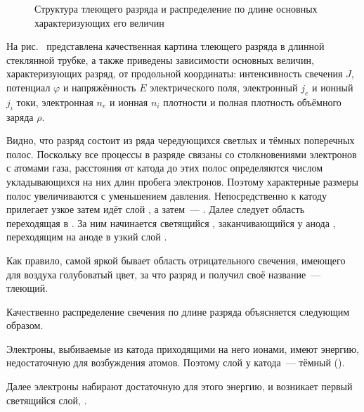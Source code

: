 


\begin{figure}[h!]
	\centering
	\caption{Структура тлеющего разряда и распределение по длине основных характеризующих его величин}
\end{figure}

На рис.~ представлена качественная картина тлеющего
разряда в длинной стеклянной трубке, а также приведены зависимости
основных величин, характеризующих разряд, от продольной координаты:
интенсивность свечения $J$, потенциал $\varphi$ и напряжённость $E$ электрического поля,
электронный $j_e$ и ионный $j_i$ токи,
электронная $n_e$ и ионная $n_i$ плотности и полная плотность объёмного заряда $\rho$.

Видно, что разряд состоит из ряда чередующихся светлых и тёмных поперечных
полос. Поскольку все процессы в разряде
связаны со столкновениями электронов с атомами газа, расстояния от катода до
этих полос определяются числом
укладывающихся на них длин пробега электронов. Поэтому характерные размеры полос
увеличиваются с уменьшением давления.
Непосредственно к катоду прилегает узкое 
затем идёт слой , а
затем~--- . Далее следует область
 переходящая в
. За ним начинается светящийся
, заканчивающийся у анода
, переходящим на аноде в узкий слой
.

Как правило, самой яркой бывает область отрицательного свечения, имеющего для
воздуха голубоватый цвет, за что разряд и
получил своё название~--- тлеющий.

Качественно распределение свечения по длине разряда объясняется следующим
образом.

Электроны, выбиваемые из катода приходящими на него ионами, имеют энергию,
недостаточную для возбуждения атомов. Поэтому слой у катода~--- тёмный
().

Далее электроны набирают достаточную
для этого энергию, и возникает первый светящийся слой,
.

